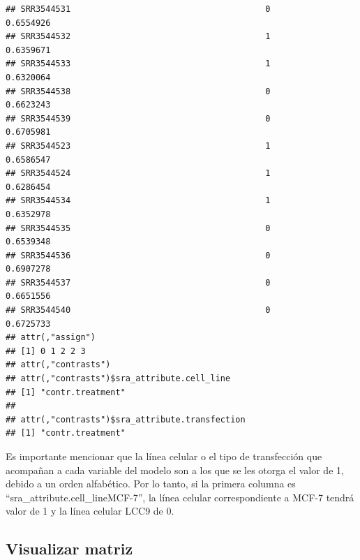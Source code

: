 \documentclass[
]{article}
\newenvironment{Shaded}{\begin{snugshade}}{\end{snugshade}}
\newcommand{\AttributeTok}[1]{\textcolor[rgb]{0.13,0.29,0.53}{#1}}
\newcommand{\CommentTok}[1]{\textcolor[rgb]{0.56,0.35,0.01}{\textit{#1}}}
\newcommand{\DecValTok}[1]{\textcolor[rgb]{0.00,0.00,0.81}{#1}}
\newcommand{\DocumentationTok}[1]{\textcolor[rgb]{0.56,0.35,0.01}{\textbf{\textit{#1}}}}
\newcommand{\FunctionTok}[1]{\textcolor[rgb]{0.13,0.29,0.53}{\textbf{#1}}}
\newcommand{\NormalTok}[1]{#1}
\newcommand{\OtherTok}[1]{\textcolor[rgb]{0.56,0.35,0.01}{#1}}
\newcommand{\SpecialCharTok}[1]{\textcolor[rgb]{0.81,0.36,0.00}{\textbf{#1}}}
\begin{document}
\begin{verbatim}
## SRR3544531                                       0          0.6554926
## SRR3544532                                       1          0.6359671
## SRR3544533                                       1          0.6320064
## SRR3544538                                       0          0.6623243
## SRR3544539                                       0          0.6705981
## SRR3544523                                       1          0.6586547
## SRR3544524                                       1          0.6286454
## SRR3544534                                       1          0.6352978
## SRR3544535                                       0          0.6539348
## SRR3544536                                       0          0.6907278
## SRR3544537                                       0          0.6651556
## SRR3544540                                       0          0.6725733
## attr(,"assign")
## [1] 0 1 2 2 3
## attr(,"contrasts")
## attr(,"contrasts")$sra_attribute.cell_line
## [1] "contr.treatment"
## 
## attr(,"contrasts")$sra_attribute.transfection
## [1] "contr.treatment"
\end{verbatim}

Es importante mencionar que la línea celular o el tipo de transfección
que acompañan a cada variable del modelo son a los que se les otorga el
valor de 1, debido a un orden alfabético. Por lo tanto, si la primera
columna es ``sra\_attribute.cell\_lineMCF-7'', la línea celular
correspondiente a MCF-7 tendrá valor de 1 y la línea celular LCC9 de 0.

\subsection{Visualizar matriz}\label{visualizar-matriz}

\begin{Shaded}
\end{Shaded}
\end{document}
